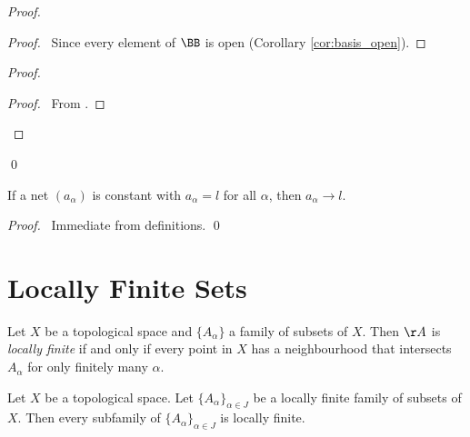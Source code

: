 \begin{proof}
    \pf
    \begin{proof}
        \pf\ Since every element of $\BB$ is open (Corollary \ref{cor:basis_open}).
    \end{proof}
    \begin{proof}
        \begin{proof}
            \pf\ From .
        \end{proof}
    \end{proof}
    \qed
\end{proof}

\begin{lemma}
    \label{lemma:converge_constant}
    If a net $(a_\alpha)$ is constant with $a_\alpha = l$ for all $\alpha$, then $a_\alpha \rightarrow l$.
\end{lemma}

\begin{proof}
    \pf\ Immediate from definitions. \qed
\end{proof}

\section{Locally Finite Sets}

\begin{definition}
    Let $X$ be a topological space and $\{ A_\alpha \}$ a family of subsets of $X$. Then $\AA$ is \emph{locally finite} if and only if every point in $X$ has a neighbourhood that
    intersects $A_\alpha$ for only finitely many $\alpha$.
\end{definition}

\begin{lemma}
    Let $X$ be a topological space. Let $\{A_\alpha\}_{\alpha \in J}$ be a locally finite family of subsets of $X$. 
    Then every subfamily of $\{A_\alpha\}_{\alpha \in J}$ is locally finite.
\end{lemma}

